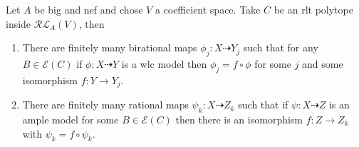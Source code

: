 \documentclass[a4paper,12pt]{amsart}
\begin{document}
	\begin{theorem}\label{weak finiteness}
		Let $A$ be big and nef and chose $V$ a coefficient space. Take $C$ be an rlt polytope inside $\mathcal{RL}_{A}(V)$, then
		
		\begin{enumerate}
			\item There are finitely many birational maps $\phi_{j}: X \dashrightarrow Y_{j}$ such that for any $B \in \mathcal{E}(C)$ if $\phi: X \dashrightarrow Y$ is a wlc model then $\phi_{j}=f \circ \phi$ for some $j$ and some isomorphism $f: Y \to Y_{j}$. \\
			\item There are finitely many rational maps $\psi_{k}: X \dashrightarrow Z_{k}$ such that if $\psi:X \dashrightarrow Z$ is an ample model for some $B \in \mathcal{E}(C)$ then there is an isomorphism $f:Z \to Z_{k}$ with $\psi_{k}=f \circ \psi_{k}$.
		\end{enumerate}
	\end{theorem}
	
\end{document}

